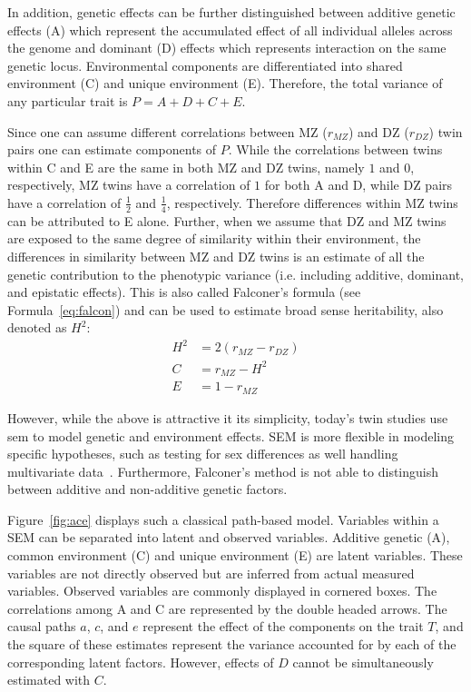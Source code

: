 In addition, genetic effects can be further distinguished between additive genetic effects (A) which represent the accumulated effect of all individual alleles across the genome and dominant (D) effects which represents interaction on the same genetic locus.
Environmental components are differentiated into shared environment (C) and unique environment (E).
Therefore, the total variance of any particular trait is $P = A+D+C+E$.

Since one can assume different correlations between MZ ($r_{MZ}$) and DZ ($r_{DZ}$) twin pairs one can estimate components of $P$.
While the correlations between twins within C and E are the same in both MZ and DZ twins, namely $1$ and $0$, respectively,
MZ twins have a correlation of $1$ for both A and D, while DZ pairs have a correlation of $\frac{1}{2}$ and $\frac{1}{4}$, respectively.
Therefore differences within MZ twins can be attributed to E alone.
Further, when we assume that DZ and MZ twins are exposed to the same degree of similarity within their environment, the differences in similarity between MZ and DZ twins is an estimate of all the genetic contribution to the phenotypic variance (i.e. including additive, dominant, and epistatic effects).
This is also called Falconer's formula (see Formula~\ref{eq:falcon}) and can be used to estimate broad sense heritability, also denoted as $H^2$:
\begin{align}
  H^2 &= 2(r_{MZ}-r_{DZ}) \label{eq:falcon} \\ 
  C &= r_{MZ} - H^2  \\
  E &= 1 - r_{MZ}  
\end{align}

However, while the above is attractive it its simplicity, today's twin studies use \acrfull{sem} to model genetic and environment effects.
SEM is more flexible in modeling specific hypotheses, such as testing for sex differences as well handling multivariate data~\cite{Rijsdijk2002}.
Furthermore, Falconer's method is not able to distinguish between additive and non-additive genetic factors.

Figure~\ref{fig:ace} displays such a classical path-based model.
Variables within a SEM can be separated into latent and observed variables.
Additive genetic (A), common environment (C) and unique environment (E) are  latent variables.
These variables are not directly observed but are inferred from actual measured variables.
Observed variables are commonly displayed in cornered boxes.
The correlations among A and C are represented by the double headed arrows.
The causal paths $a$, $c$, and $e$ represent the effect of the components on the trait $T$, and the square of these estimates represent the variance accounted for by each of the corresponding latent factors.
However, effects of $D$ cannot be simultaneously estimated with $C$.

